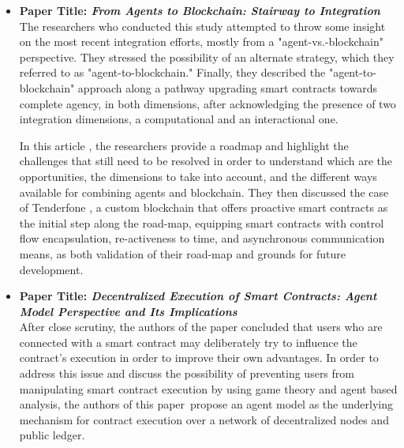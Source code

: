\begin{itemize}[label={}]

\item \textbf{Paper Title: \textit{From Agents to Blockchain: Stairway to Integration}} \\

The researchers who conducted this study attempted to throw some insight on the most recent integration efforts, mostly from a "agent-vs.-blockchain" perspective. They stressed the possibility of an alternate strategy, which they referred to as "agent-to-blockchain." Finally, they described the "agent-to-blockchain" approach along a pathway upgrading smart contracts towards complete agency, in both dimensions, after acknowledging the presence of two integration dimensions, a computational and an interactional one.

\vspace{.5cm}

In this article \cite{ag2bc}, the researchers provide a roadmap and highlight the challenges that still need to be resolved in order to understand which are the opportunities, the dimensions to take into account, and the different ways available for combining agents and blockchain. They then discussed the case of Tenderfone \cite{tenGlab}, a custom blockchain that offers proactive smart contracts as the initial step along the road-map, equipping smart contracts with control flow encapsulation, re-activeness to time, and asynchronous communication means, as both validation of their road-map and grounds for future development.

\vspace{.5cm}

\item \textbf{Paper Title: \textit{Decentralized Execution of Smart Contracts: Agent Model Perspective and Its Implications}}\\

After close scrutiny, the authors of the paper \cite{decentralized} concluded that users who are connected with a smart contract may deliberately try to influence the contract's execution in order to improve their own advantages. In order to address this issue and discuss the possibility of preventing users from manipulating smart contract execution by using game theory and agent based analysis, the authors of this paper propose an agent model as the underlying mechanism for contract execution over a network of decentralized nodes and public ledger.

\vspace{.5cm}


\end{itemize}
